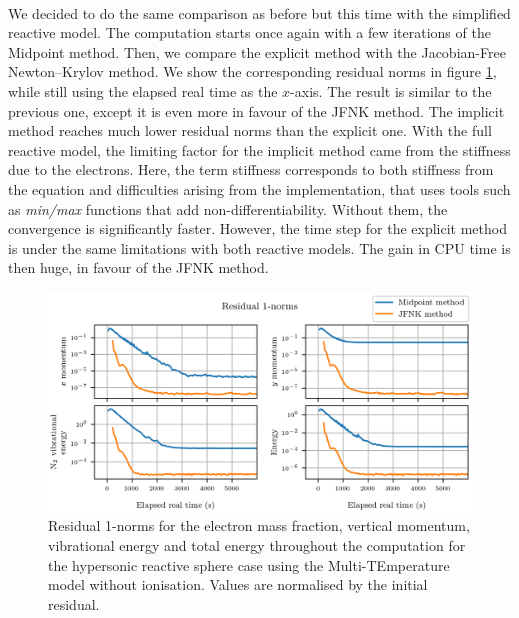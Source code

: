         \paragraph{}
        We decided to do the same comparison as before but this time with the simplified reactive model.
        The computation starts once again with a few iterations of the Midpoint method.
        Then, we compare the explicit method with the Jacobian-Free Newton--Krylov method.
        We show the corresponding residual norms in figure \ref{fig:sphere_tv_residuals}, while still using the elapsed real time as the $x$-axis.
        The result is similar to the previous one, except it is even more in favour of the JFNK method.
        The implicit method reaches much lower residual norms than the explicit one.
        With the full reactive model, the limiting factor for the implicit method came from the stiffness due to the electrons.
        Here, the term stiffness corresponds to both stiffness from the equation and difficulties arising from the implementation, that uses tools such as \emph{min/max} functions that add non-differentiability.
        Without them, the convergence is significantly faster.
        However, the time step for the explicit method is under the same limitations with both reactive models.
        The gain in CPU time is then huge, in favour of the JFNK method.

        \begin{figure}
          \centering
          \includegraphics{figures/sphere_tv_residuals.png}
          \caption{Residual 1-norms for the electron mass fraction, vertical momentum,  vibrational energy and total energy throughout the computation for the hypersonic reactive sphere case using the Multi-TEmperature model without ionisation.
          Values are normalised by the initial residual.}
          \label{fig:sphere_tv_residuals}
        \end{figure}


